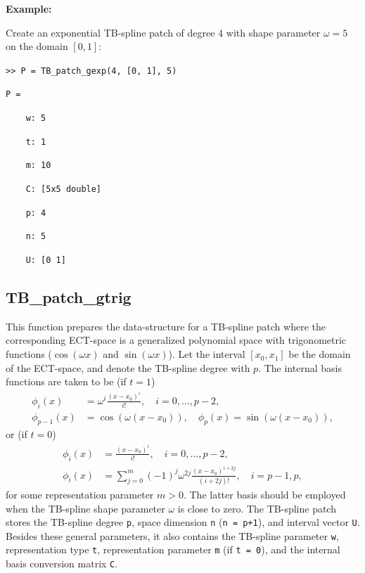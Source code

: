 \documentclass[10pt]{acmtrans2e}
\newenvironment{example}
{\vspace*{0.1cm}
\noindent \textbf{Example:} \vspace*{0.15cm}

\setlength{\parskip}{0.5ex plus 0.5exminus 0.2 ex}
}
{\medskip
}
\begin{document}
\begin{example}
\noindent Create an exponential TB-spline patch of degree $4$ with shape parameter $\omega=5$ on the domain $[0,1]$:
\medskip

\texttt{>> P = TB\_patch\_gexp(4, [0, 1], 5)}

\texttt{P = }

\texttt{\ \ \ \ w:\ 5}

\texttt{\ \ \ \ t:\ 1}

\texttt{\ \ \ \ m:\ 10}

\texttt{\ \ \ \ C:\ [5x5 double]}

\texttt{\ \ \ \ p:\ 4}

\texttt{\ \ \ \ n:\ 5}

\texttt{\ \ \ \ U:\ [0 1]}
\end{example}


\subsection{TB\_patch\_gtrig} \label{sec:matlab-tb-patch-gtrig}

This function prepares the data-structure for a TB-spline patch where the corresponding ECT-space is a generalized polynomial space with trigonometric functions ($\cos(\omega x)$ and $\sin(\omega x)$). Let the interval $[x_0,x_1]$ be the domain of the ECT-space, and denote the TB-spline degree with $p$. The internal basis functions are taken to be (if $t=1$)
\begin{align*}
  \phi_i(x) &= \omega^i\frac{(x-x_0)^i}{i!}, \quad i=0,\ldots,p-2, 
  \\
  \phi_{p-1}(x) &= \cos(\omega(x-x_0)), \quad \phi_p(x) = \sin(\omega(x-x_0)),
\end{align*}
or (if $t=0$)
\begin{align*}
  \phi_i(x) &= \frac{(x-x_0)^i}{i!}, \quad i=0,\ldots,p-2,
  \\
  \phi_i(x) &= \sum_{j=0}^{m}(-1)^j\omega^{2j}\frac{(x-x_0)^{i+2j}}{({i+2j})!}, \quad i=p-1,p,
\end{align*}
for some representation parameter $m>0$. The latter basis should be employed when the TB-spline shape parameter $\omega$ is close to zero. The TB-spline patch stores the TB-spline degree \texttt{p}, space dimension \texttt{n} (\texttt{n = p+1}), and interval vector \texttt{U}. Besides these general parameters, it also contains the TB-spline parameter \texttt{w}, representation type \texttt{t}, representation parameter \texttt{m} (if \texttt{t = 0}), and the internal basis conversion matrix \texttt{C}.
\end{document}
